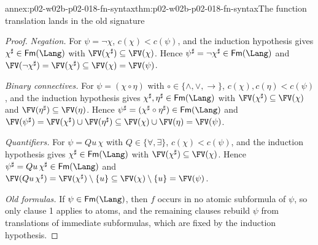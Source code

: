 \begin{annexitem}{annex:p02-w02b-p02-018-fn-syntax}{thm:p02-w02b-p02-018-fn-syntax}{The function translation lands in the old signature}
\begin{proof}
\emph{Negation.}  For \(\psi=\neg\chi\), \(c(\chi)<c(\psi)\), and the
induction hypothesis gives \(\chi^{\sharp}\in\mathsf{Fm}(\Lang)\) with
\(\FV(\chi^{\sharp})\subseteq\FV(\chi)\).  Hence
\(\psi^{\sharp}=\neg\chi^{\sharp}\in\mathsf{Fm}(\Lang)\) and
\(\FV(\neg\chi^{\sharp})=\FV(\chi^{\sharp})\subseteq\FV(\chi)=\FV(\psi)\).

\emph{Binary connectives.}  For \(\psi=(\chi\circ\eta)\) with
\(\circ\in\{\land,\lor,\to\}\), \(c(\chi),c(\eta)<c(\psi)\), and the
induction hypothesis gives \(\chi^{\sharp},\eta^{\sharp}\in\mathsf{Fm}(\Lang)\)
with \(\FV(\chi^{\sharp})\subseteq\FV(\chi)\) and
\(\FV(\eta^{\sharp})\subseteq\FV(\eta)\).  Hence
\(\psi^{\sharp}=(\chi^{\sharp}\circ\eta^{\sharp})\in\mathsf{Fm}(\Lang)\) and
\(\FV(\psi^{\sharp})=\FV(\chi^{\sharp})\cup\FV(\eta^{\sharp})
\subseteq\FV(\chi)\cup\FV(\eta)=\FV(\psi)\).

\emph{Quantifiers.}  For \(\psi=Qu\,\chi\) with \(Q\in\{\forall,\exists\}\),
\(c(\chi)<c(\psi)\), and the induction hypothesis gives
\(\chi^{\sharp}\in\mathsf{Fm}(\Lang)\) with
\(\FV(\chi^{\sharp})\subseteq\FV(\chi)\).  Hence
\(\psi^{\sharp}=Qu\,\chi^{\sharp}\in\mathsf{Fm}(\Lang)\) and
\(\FV(Qu\,\chi^{\sharp})=\FV(\chi^{\sharp})\setminus\{u\}
\subseteq\FV(\chi)\setminus\{u\}=\FV(\psi)\).

\emph{Old formulas.}  If \(\psi\in\mathsf{Fm}(\Lang)\), then \(f\) occurs in
no atomic subformula of \(\psi\), so only clause 1 applies to atoms, and
the remaining clauses rebuild \(\psi\) from translations of immediate
subformulas, which are fixed by the induction hypothesis.
\end{proof}
\end{annexitem}

